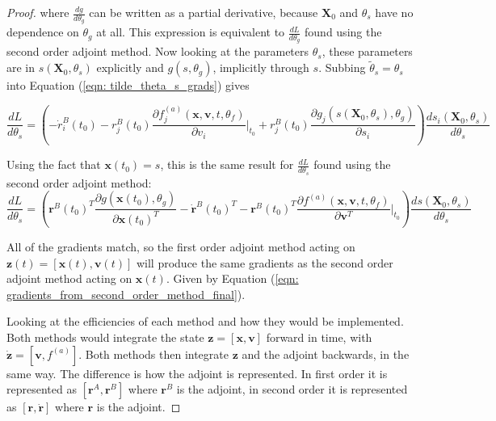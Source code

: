 \documentclass{article}
\theoremstyle{remark}
\theoremstyle{definition}
\begin{document}
\begin{proof}
where $\displaystyle  \frac{dg}{d\theta_{g}}$ can be written as a partial derivative, because $\mathbf{X}_{0}$ and $\theta_{s}$ have no dependence on $\theta_{g}$ at all. This expression is equivalent to $\displaystyle  \frac{dL}{d\theta_{g}}$ found using the second order adjoint method. Now looking at the parameters $\theta_{s}$, these parameters are in $s(\mathbf{X}_{0}, \theta_{s})$ explicitly and $g(s, \theta_{g})$, implicitly through $s$. Subbing $\tilde{\theta}_{s} = \theta_{s}$ into Equation (\ref{eqn: tilde_theta_s_grads}) gives

\begin{equation}
\frac{dL}{d\theta_{s}}=
\left(
-\dot{r}^{B}_{i}(t_{0}) - r^{B}_{j}(t_{0})\frac{\partial f^{(a)}_{j}(\mathbf{x},\mathbf{v}, t, \theta_{f})}{\partial v_{i}}\Biggr\vert_{t_{0}}
+ r^{B}_{j}(t_{0})\frac{\partial g_{j}(s(\mathbf{X}_{0}, \theta_{s}), \theta_{g})}
{\partial s_{i}}
 \right)
\frac{ds_{i}(\mathbf{X}_{0}, \theta_{s})}{d\theta_{s}}
\end{equation}

Using the fact that $\mathbf{x}(t_0) = s$, this is the same result for $\displaystyle  \frac{dL}{d\theta_{s}}$ found using the second order adjoint method: 
\begin{equation}
    \frac{dL}{d\theta_{s}}=\left(
    \mathbf{r}^{B}(t_{0})^{T}
    \frac{\partial g(\mathbf{x}(t_{0}), \theta_{g})}{\partial \mathbf{x}(t_{0})^{T}}
    -\dot{\mathbf{r}}^{B}(t_{0})^{T} 
    - \mathbf{r}^{B}(t_{0})^{T}
    \frac{\partial f^{(a)}(\mathbf{x},\mathbf{v},t,\theta_{f})}{\partial \mathbf{v}^{T}}\Biggr\vert_{t_{0}} 
    \right)
    \frac{ds(\mathbf{X}_{0}, \theta_{s})}{d\theta_{s}}
\end{equation}


All of the gradients match, so the first order adjoint method acting on $\mathbf{z}(t) = [\mathbf{x}(t), \mathbf{v}(t)]$ will produce the same gradients as the second order adjoint method acting on $\mathbf{x}(t)$. Given by Equation (\ref{eqn: gradients_from_second_order_method_final}).

Looking at the efficiencies of each method and how they would be implemented. Both methods would integrate the state $\mathbf{z} = [\mathbf{x}, \mathbf{v}]$ forward in time, with $\dot{\mathbf{z}} = [\mathbf{v}, f^{(a)}]$. Both methods then integrate $\mathbf{z}$ and the adjoint backwards, in the same way. The difference is how the adjoint is represented. In first order it is represented as $[\mathbf{r}^{A}, \mathbf{r}^{B}]$ where $\mathbf{r}^{B}$ is the adjoint, in second order it is represented as $[\mathbf{r}, \dot{\mathbf{r}}]$ where $\mathbf{r}$ is the adjoint.


\end{proof}
\end{document}
